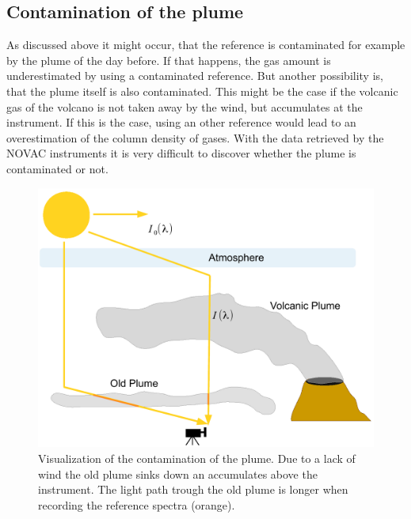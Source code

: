 \subsection{Contamination of the plume}
As discussed above it might occur, that the reference is contaminated for example by the plume of the day before.
If that happens, the gas amount is underestimated by using a contaminated reference. But another possibility is, that the plume itself is also contaminated. This might be the case if the volcanic gas of the volcano is not taken away by the wind, but accumulates at the instrument. If this is the case, using an other reference would lead to an overestimation of the column density of gases. With the data retrieved by the NOVAC instruments it is very difficult to discover whether the plume is contaminated or not. \\
%
%
\begin{figure}
	\centering
	\includegraphics[width=0.7\linewidth]{Bilder/Contaminationplume}
	\caption{Visualization of the contamination of the plume. Due to a lack of wind the old plume sinks down an accumulates
		above the instrument. The light path trough the old plume is longer when recording the reference spectra (orange).}
	\label{fig:contaminationplume}
\end{figure}
